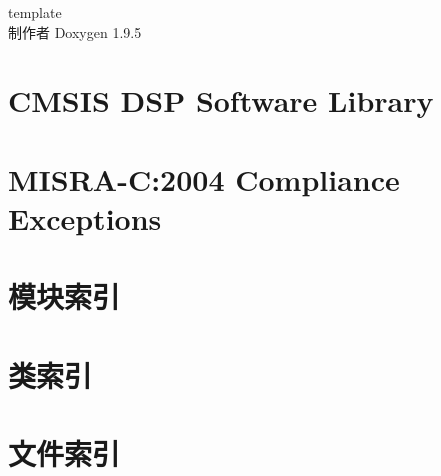 \documentclass[twoside]{book}
\newcommand{\+}{\discretionary{\mbox{\scriptsize$\hookleftarrow$}}{}{}}
\newcommand{\clearemptydoublepage}{%
    \newpage{\pagestyle{empty}\cleardoublepage}%
  }
\begin{document}
  \raggedbottom
  \begin{CJK}{UTF8}{gbsn}
    \hypersetup{pageanchor=false,
                bookmarksnumbered=true,
                pdfencoding=unicode
               }
  \begin{titlepage}
  \vspace*{7cm}
  \begin{center}%
  {\Large template}\\
  \vspace*{1cm}
  {\large 制作者 Doxygen 1.9.5}\\
  \end{center}
  \end{titlepage}
  \clearemptydoublepage
  \tableofcontents
  \clearemptydoublepage
  \hypersetup{pageanchor=true}
\chapter{CMSIS DSP Software Library}
\label{index}\hypertarget{index}{}
\chapter{MISRA-\/C\+:2004 Compliance Exceptions}
\label{_c_m_s_i_s__m_i_s_r_a__exceptions}

\chapter{模块索引}

\chapter{类索引}

\chapter{文件索引}


\end{CJK}
\end{document}
